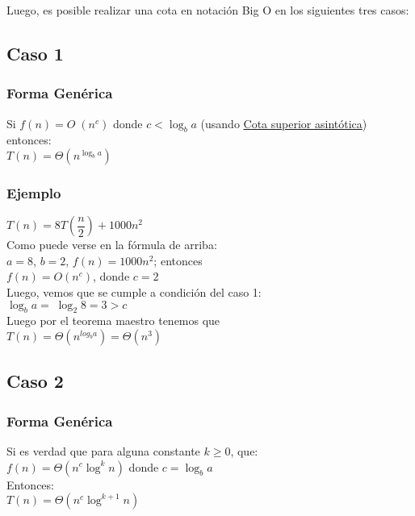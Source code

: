 \documentclass[a4paper,11pt]{article}
\begin{document}
Luego, es posible realizar una cota en notación Big O en los siguientes tres casos:

\subsection{Caso 1}
\subsubsection{Forma Genérica} \noindent
Si $f(n) = O \;(n^{c})$ donde $c < \log_b a$ (usando \href{https://es.wikipedia.org/wiki/Cota_superior_asintótica}{Cota superior asintótica})\\ entonces:\\
$T(n) = \Theta (n^{\log_b a})$
\subsubsection{Ejemplo}
$T(n) = 8T (\dfrac{n}{2}) + 1000n^{2}$\\
Como puede verse en la fórmula de arriba:\\
$a=8$, $b=2$, $f(n)=1000n^{2}$; entonces\\
$f(n) = O (n^{c})$, donde $c = 2$\\
Luego, vemos que se cumple a condición del caso 1:\\
$\log_b a = \; \log_2 8 = 3 > c$\\
Luego por el teorema maestro tenemos que\\
$T(n) = \Theta (n^{log_b a})=\Theta (n^{3})$

\subsection{Caso 2}
\subsubsection{Forma Genérica}\noindent
Si es verdad que para alguna constante $k \geq 0$, que:\\
$f(n) = \Theta (n^{c} \log^{k} n)$ donde $c=\log_b a$\\
Entonces:\\
$T(n)=\Theta(n^{c} \log^{k+1} n)$
\end{document}
